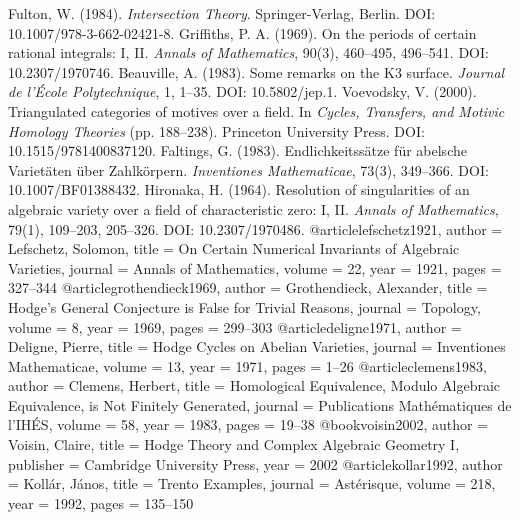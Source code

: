 \documentclass[11pt]{article}
\begin{document}

\begin{thebibliography}{5}
 Fulton, W. (1984). \emph{Intersection Theory}. Springer-Verlag, Berlin. DOI: 10.1007/978-3-662-02421-8.
 Griffiths, P. A. (1969). On the periods of certain rational integrals: I, II. \emph{Annals of Mathematics}, 90(3), 460–495, 496–541. DOI: 10.2307/1970746.
 Beauville, A. (1983). Some remarks on the K3 surface. \emph{Journal de l’École Polytechnique}, 1, 1–35. DOI: 10.5802/jep.1.
 Voevodsky, V. (2000). Triangulated categories of motives over a field. In \emph{Cycles, Transfers, and Motivic Homology Theories} (pp. 188–238). Princeton University Press. DOI: 10.1515/9781400837120.
 Faltings, G. (1983). Endlichkeitssätze für abelsche Varietäten über Zahlkörpern. \emph{Inventiones Mathematicae}, 73(3), 349–366. DOI: 10.1007/BF01388432.
 Hironaka, H. (1964). Resolution of singularities of an algebraic variety over a field of characteristic zero: I, II. \emph{Annals of Mathematics}, 79(1), 109–203, 205–326. DOI: 10.2307/1970486.
@article{lefschetz1921,
  author = {Lefschetz, Solomon},
  title = {On Certain Numerical Invariants of Algebraic Varieties},
  journal = {Annals of Mathematics},
  volume = {22},
  year = {1921},
  pages = {327--344}
}
@article{grothendieck1969,
  author = {Grothendieck, Alexander},
  title = {Hodge's General Conjecture is False for Trivial Reasons},
  journal = {Topology},
  volume = {8},
  year = {1969},
  pages = {299--303}
}
@article{deligne1971,
  author = {Deligne, Pierre},
  title = {Hodge Cycles on Abelian Varieties},
  journal = {Inventiones Mathematicae},
  volume = {13},
  year = {1971},
  pages = {1--26}
}
@article{clemens1983,
  author = {Clemens, Herbert},
  title = {Homological Equivalence, Modulo Algebraic Equivalence, is Not Finitely Generated},
  journal = {Publications Mathématiques de l'IHÉS},
  volume = {58},
  year = {1983},
  pages = {19--38}
}
@book{voisin2002,
  author = {Voisin, Claire},
  title = {Hodge Theory and Complex Algebraic Geometry I},
  publisher = {Cambridge University Press},
  year = {2002}
}
@article{kollar1992,
  author = {Kollár, János},
  title = {Trento Examples},
  journal = {Astérisque},
  volume = {218},
  year = {1992},
  pages = {135--150}
}
\end{thebibliography}


\end{document}
